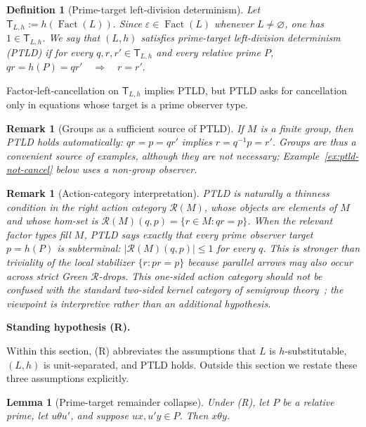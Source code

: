 \documentclass[11pt,a4paper]{article}
\newtheorem{lemma}[theorem]{Lemma}
\newtheorem{definition}[theorem]{Definition}
\newtheorem{remark}[theorem]{Remark}
\newcommand{\eps}{\varepsilon}
\newcommand{\Fact}{\operatorname{Fact}}
\begin{document}
\begin{definition}[Prime-target left-division determinism]
Let
\(\mathsf T_{L,h}:=h(\Fact(L)).\)  Since $\eps\in\Fact(L)$ whenever $L\ne\varnothing$, one has $1\in\mathsf T_{L,h}$.
We say that $(L,h)$ satisfies \emph{prime-target left-division determinism} (PTLD) if for every $q,r,r'\in \mathsf T_{L,h}$ and every relative prime $P$,
\(qr=h(P)=qr' \quad\Longrightarrow\quad r=r'.\)
\end{definition}

Factor-left-cancellation on $\mathsf T_{L,h}$ implies PTLD, but PTLD asks for cancellation only in equations whose target is a prime observer type.

\begin{remark}[Groups as a sufficient source of PTLD]
If $M$ is a finite group, then PTLD holds automatically: $qr=p=qr'$ implies $r=q^{-1}p=r'$.  Groups are thus a convenient source of examples, although they are not necessary; Example~\ref{ex:ptld-not-cancel} below uses a non-group observer.
\end{remark}

\begin{remark}[Action-category interpretation]
PTLD is naturally a thinness condition in the right action category $\mathcal R(M)$, whose objects are elements of $M$ and whose hom-set is $\mathcal R(M)(q,p)=\{r\in M:qr=p\}$.  When the relevant factor types fill $M$, PTLD says exactly that every prime observer target $p=h(P)$ is subterminal: $|\mathcal R(M)(q,p)|\le1$ for every $q$.  This is stronger than triviality of the local stabilizer $\{r:pr=p\}$ because parallel arrows may also occur across strict Green $\mathcal R$-drops.  This one-sided action category should not be confused with the standard two-sided kernel category of semigroup theory~\cite{Tilson1987}; the viewpoint is interpretive rather than an additional hypothesis.
\end{remark}

\medskip
\noindent\textbf{Standing hypothesis (R).}\par\noindent
Within this section, \textup{(R)} abbreviates the assumptions that $L$ is
$h$-substitutable, $(L,h)$ is unit-separated, and PTLD holds.  Outside
this section we restate these three assumptions explicitly.

\begin{lemma}[Prime-target remainder collapse]
\label{lem:ptld-collapse}
Under \textup{(R)}, let $P$ be a relative prime, let $u\theta u'$, and suppose $ux,u'y\in P$.  Then $x\theta y$.
\end{lemma}
\end{document}
